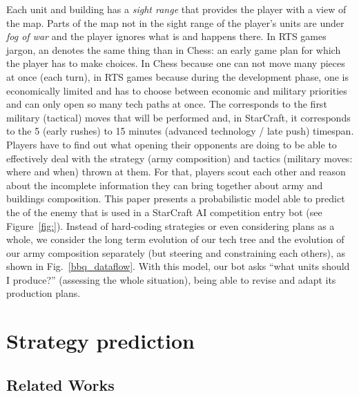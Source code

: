 Each unit and building has a \textit{sight range} that provides the player with a view of the map. Parts of the map not in the sight range of the player's units are under \textit{fog of war} and the player ignores what is and happens there.
In RTS games jargon, an \textit{} denotes the same thing than in Chess: an early game plan for which the player has to make choices. In Chess because one can not move many pieces at once (each turn), in RTS games because during the development phase, one is economically limited and has to choose between economic and military priorities and can only open so many tech paths at once. The \textit{} corresponds to the first military (tactical) moves that will be performed and, in StarCraft, it corresponds to the 5 (early rushes) to 15 minutes (advanced technology / late push) timespan. 
Players have to find out what opening their opponents are doing to be able to effectively deal with the strategy (army composition) and tactics (military moves: where and when) thrown at them. For that, players scout each other and reason about the incomplete information they can bring together about army and buildings composition. This paper presents a probabilistic model able to predict the \textit{} of the enemy that is used in a StarCraft AI competition entry bot (see Figure~\ref{fig:}). Instead of hard-coding strategies or even considering plans as a whole, we consider the long term evolution of our tech tree and the evolution of our army composition separately (but steering and constraining each others), as shown in Fig.~\ref{bbq_dataflow}. With this model, our bot asks ``what units should I produce?'' (assessing the whole situation), being able to revise and adapt its production plans.


\section{Strategy prediction}

\subsection{Related Works}


